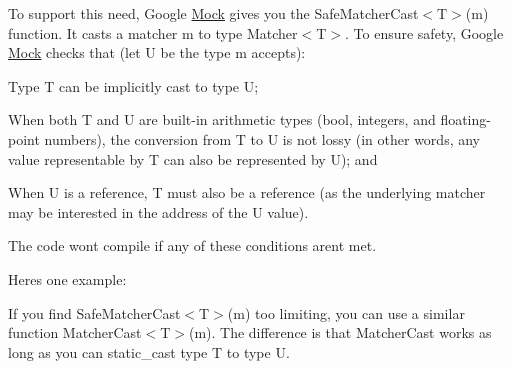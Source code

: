 To support this need, Google \mbox{\hyperlink{classMock}{Mock}} gives you the {\ttfamily Safe\+Matcher\+Cast$<$T$>$(m)} function. It casts a matcher {\ttfamily m} to type {\ttfamily Matcher$<$T$>$}. To ensure safety, Google \mbox{\hyperlink{classMock}{Mock}} checks that (let {\ttfamily U} be the type {\ttfamily m} accepts)\+:


\begin{DoxyEnumerate}
\item Type {\ttfamily T} can be implicitly cast to type {\ttfamily U};
\end{DoxyEnumerate}
\begin{DoxyEnumerate}
\item When both {\ttfamily T} and {\ttfamily U} are built-\/in arithmetic types ({\ttfamily bool}, integers, and floating-\/point numbers), the conversion from {\ttfamily T} to {\ttfamily U} is not lossy (in other words, any value representable by {\ttfamily T} can also be represented by {\ttfamily U}); and
\end{DoxyEnumerate}
\begin{DoxyEnumerate}
\item When {\ttfamily U} is a reference, {\ttfamily T} must also be a reference (as the underlying matcher may be interested in the address of the {\ttfamily U} value).
\end{DoxyEnumerate}

The code won\textquotesingle{}t compile if any of these conditions aren\textquotesingle{}t met.

Here\textquotesingle{}s one example\+:


\begin{DoxyCode}{0}
\DoxyCodeLine{}
\DoxyCodeLine{}
\DoxyCodeLine{\};}
\DoxyCodeLine{}
\end{DoxyCode}


If you find {\ttfamily Safe\+Matcher\+Cast$<$T$>$(m)} too limiting, you can use a similar function {\ttfamily Matcher\+Cast$<$T$>$(m)}. The difference is that {\ttfamily Matcher\+Cast} works as long as you can {\ttfamily static\+\_\+cast} type {\ttfamily T} to type {\ttfamily U}.

